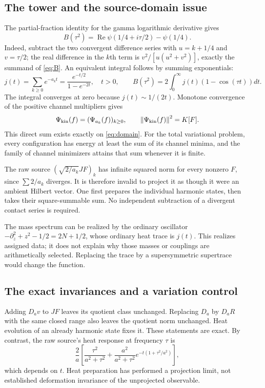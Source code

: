 \documentclass[11pt]{article}
\numberwithin{equation}{section}
\theoremstyle{definition}
\theoremstyle{remark}
\newcommand{\re}{\operatorname{Re}}
\newcommand{\norm}[1]{\left\lVert#1\right\rVert}
\begin{document}
\subsection{The tower and the source-domain issue}
The partial-fraction identity for the gamma logarithmic derivative gives
\begin{equation}
 B(\tau^2)=\re\psi(1/4+i\tau/2)-\psi(1/4).
 \label{eq:digamma}
\end{equation}
Indeed, subtract the two convergent difference series with $u=k+1/4$ and $v=\tau/2$; the real difference in the $k$th term is $v^2/[u(u^2+v^2)]$, exactly the summand of \eqref{eq:B}. An equivalent integral follows by summing exponentials:
\begin{equation}
 j(t)=\sum_{k\ge0}e^{-a_kt}
 =\frac{e^{-t/2}}{1-e^{-2t}},\quad t>0,
 \qquad B(\tau^2)=2\int_0^\infty j(t)(1-\cos(\tau t))dt.
 \label{eq:j}
\end{equation}
The integral converges at zero because $j(t)\sim1/(2t)$. Monotone convergence of the positive channel multipliers gives
\begin{equation}
 \Psi_{\rm kin}(f)=(\Psi_{a_k}(f))_{k\ge0},\qquad
 \norm{\Psi_{\rm kin}(f)}^2=K[F].
 \label{eq:tower}
\end{equation}
This direct sum exists exactly on \eqref{eq:domain}. For the total variational problem, every configuration has energy at least the sum of its channel minima, and the family of channel minimizers attains that sum whenever it is finite.

The raw source $(\sqrt{2/a_k}JF)_k$ has infinite squared norm for every nonzero $F$, since $\sum2/a_k$ diverges. It is therefore invalid to project it as though it were an ambient Hilbert vector. One first prepares the individual harmonic states, then takes their square-summable sum. No independent subtraction of a divergent contact series is required.

The mass spectrum can be realized by the ordinary oscillator $-\partial_z^2+z^2-1/2=2N+1/2$, whose ordinary heat trace is $j(t)$. This realizes assigned data; it does not explain why those masses or couplings are arithmetically selected. Replacing the trace by a supersymmetric supertrace would change the function.

\subsection{The exact invariances and a variation control}
Adding $D_av$ to $JF$ leaves its quotient class unchanged. Replacing $D_a$ by $D_aR$ with the same closed range also leaves the quotient norm unchanged. Heat evolution of an already harmonic state fixes it. These statements are exact. By contrast, the raw source's heat response at frequency $\tau$ is
\begin{equation}
 \frac2a\left[\frac{\tau^2}{a^2+\tau^2}
 +\frac{a^2}{a^2+\tau^2}e^{-t(1+\tau^2/a^2)}\right],
\end{equation}
which depends on $t$. Heat preparation has performed a projection limit, not established deformation invariance of the unprojected observable.
\end{document}
